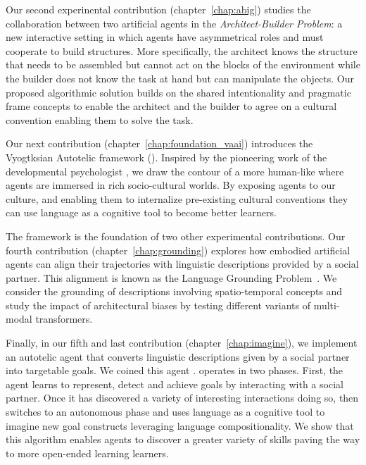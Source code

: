 Our second experinental contribution (chapter~\ref{chap:abig}) studies the collaboration between two artificial agents in the \textit{Architect-Builder Problem}: a new interactive setting in which agents have asymmetrical roles and must cooperate to build structures. More specifically, the architect knows the structure that needs to be assembled but cannot act on the blocks of the environment while the builder does not know the task at hand but can manipulate the objects. Our proposed algorithmic solution builds on the shared intentionality and pragmatic frame concepts to enable the architect and the builder to agree on a cultural convention enabling them to solve the task. 

Our next contribution (chapter~\ref{chap:foundation_vaai}) introduces the Vyogtksian Autotelic \ai framework (\vaai). Inspired by the pioneering work of the developmental psychologist \citet{vygotsky_thought_1934}, we draw the contour of a more human-like \ai where agents are immersed in rich socio-cultural worlds. By exposing agents to our culture, and enabling them to internalize pre-existing cultural conventions they can use language as a cognitive tool to become better learners. 

The \vaai framework is the foundation of two other experimental contributions. Our fourth contribution (chapter~\ref{chap:grounding}) explores how embodied artificial agents can align their trajectories with linguistic descriptions provided by a social partner. This alignment is known as the Language Grounding Problem~\citep{glenberg_grounding_2002,zwaan_madden_2005}. We consider the grounding of descriptions involving spatio-temporal concepts and study the impact of architectural biases by testing different variants of multi-modal transformers.

Finally, in our fifth and last contribution (chapter~\ref{chap:imagine}), we implement an autotelic agent that converts linguistic descriptions given by a social partner into targetable goals. We coined this agent \imagine. \imagine operates in two phases. First, the agent learns to represent, detect and achieve goals by interacting with a social partner. Once it has discovered a variety of interesting interactions doing so, \imagine then switches to an autonomous phase and uses language as a cognitive tool to imagine new goal constructs leveraging language compositionality. We show that this algorithm enables agents to discover a greater variety of skills paving the way to more open-ended learning learners.



